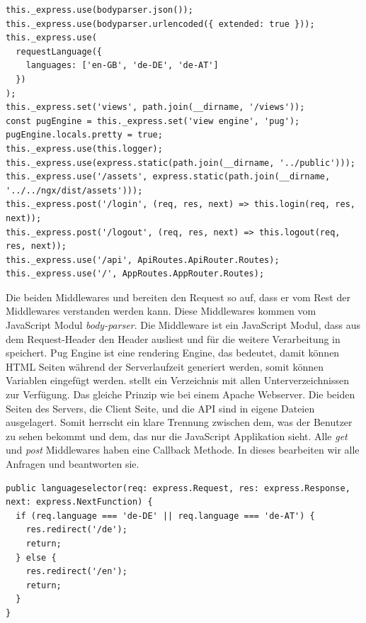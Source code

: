 \begin{lstlisting}[style=TS,caption=Middlewares,label=middlewares]
this._express.use(bodyparser.json());
this._express.use(bodyparser.urlencoded({ extended: true }));
this._express.use(
  requestLanguage({
    languages: ['en-GB', 'de-DE', 'de-AT']
  })
);
this._express.set('views', path.join(__dirname, '/views'));
const pugEngine = this._express.set('view engine', 'pug');
pugEngine.locals.pretty = true;
this._express.use(this.logger);
this._express.use(express.static(path.join(__dirname, '../public')));
this._express.use('/assets', express.static(path.join(__dirname, '../../ngx/dist/assets')));
this._express.post('/login', (req, res, next) => this.login(req, res, next));
this._express.post('/logout', (req, res, next) => this.logout(req, res, next));
this._express.use('/api', ApiRoutes.ApiRouter.Routes);
this._express.use('/', AppRoutes.AppRouter.Routes);
\end{lstlisting}

Die beiden Middlewares  und  bereiten den Request so auf, dass er vom Rest der Middlewares verstanden werden kann. Diese Middlewares kommen vom JavaScript Modul \textit{body-parser}. Die Middleware  ist ein JavaScript Modul, dass aus dem Request-Header den Header  ausliest und für die weitere Verarbeitung in  speichert. Pug Engine ist eine rendering Engine, das bedeutet, damit können \ac{HTML} Seiten während der Serverlaufzeit generiert werden, somit können Variablen eingefügt werden.  stellt ein Verzeichnis mit allen Unterverzeichnissen zur Verfügung. Das gleiche Prinzip wie bei einem Apache Webserver. Die beiden Seiten des Servers, die Client Seite, und die \ac{API} sind in eigene Dateien ausgelagert. Somit herrscht ein klare Trennung zwischen dem, was der Benutzer zu sehen bekommt und dem, das nur die JavaScript Applikation sieht. Alle \textit{get} und \textit{post} Middlewares haben eine Callback Methode. In dieses bearbeiten wir alle Anfragen und beantworten sie.

\begin{lstlisting}[caption=Sprachenauswahl,style=TS,label=sprachenauswahl]
public languageselector(req: express.Request, res: express.Response, next: express.NextFunction) {
  if (req.language === 'de-DE' || req.language === 'de-AT') {
    res.redirect('/de');
    return;
  } else {
    res.redirect('/en');
    return;
  }
}
\end{lstlisting}

